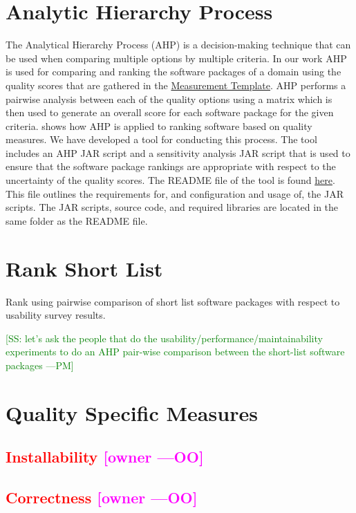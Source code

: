 \documentclass[letterpaper,cleveref]{lipics-v2019}
\newcommand{\authornote}[3]{\textcolor{#1}{[#3 ---#2]}}
\newcommand{\authornote}[3]{}
\newcommand{\oo}[1]{\authornote{magenta}{OO}{#1}} %
\newcommand{\pmi}[1]{\authornote{green}{PM}{#1}} %
\newcommand{\notdone}[1]{\textcolor{red}{#1}}
\theoremstyle{definition}
\begin{document}
\section{Analytic Hierarchy Process} \label{SecAHP}
The Analytical Hierarchy Process (AHP) is a decision-making technique that can be used when comparing multiple options by multiple criteria. In our work AHP is used for comparing and ranking the software packages of a domain using the quality scores that are gathered in the \href{run:Combined_MeasurementTemplate_EmpiricalMeasures.xlsx}{Measurement Template}. AHP performs a pairwise analysis between each of the quality options using a matrix which is then used to generate an overall score for each software package for the given criteria. \cite{SmithEtAl2016} shows how AHP is applied to ranking software based on quality measures. We have developed a tool for conducting this process. The tool includes an AHP JAR script and a sensitivity analysis JAR script that is used to ensure that the software package rankings are appropriate with respect to the uncertainty of the quality scores. The README file of the tool is found \href{run:../AHP2020/LBM/README.txt}{here}. This file outlines the requirements for, and configuration and usage of, the JAR scripts. The JAR scripts, source code, and required libraries are located in the same folder as the README file.

\section{Rank Short List} \label{SecRankShortList}
Rank using pairwise comparison of short list software packages with respect to usability survey results.

\pmi{SS: let's ask the people that do the usability/performance/maintainability experiments to do an AHP pair-wise comparison between the short-list software packages}

\section{Quality Specific Measures}

\subsection{\notdone{Installability} \oo{owner}}

\subsection{\notdone{Correctness} \oo{owner}}
\end{document}
